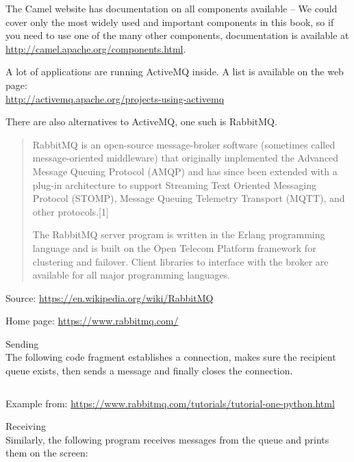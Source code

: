\documentclass[Screen16to9,17pt]{foils}
\begin{document}


The Camel website has documentation on all components available -- We could cover
only the most widely used and important components in this book, so if you need
to use one of the many other components, documentation is available at
\url{http://camel.apache.org/components.html}.


A lot of applications are running ActiveMQ inside. A list is available on the web page:\\
\url{http://activemq.apache.org/projects-using-activemq}

There are also alternatives to ActiveMQ, one such is RabbitMQ.



\begin{quote}
RabbitMQ is an open-source message-broker software (sometimes called message-oriented middleware) that originally implemented the Advanced Message Queuing Protocol (AMQP) and has since been extended with a plug-in architecture to support Streaming Text Oriented Messaging Protocol (STOMP), Message Queuing Telemetry Transport (MQTT), and other protocols.[1]

The RabbitMQ server program is written in the Erlang programming language and is built on the Open Telecom Platform framework for clustering and failover. Client libraries to interface with the broker are available for all major programming languages.
\end{quote}

Source: \url{https://en.wikipedia.org/wiki/RabbitMQ}

Home page: \url{https://www.rabbitmq.com/}



Sending\\
The following code fragment establishes a connection, makes sure the recipient queue exists, then sends a message and finally closes the connection.

\inputminted[fontsize=\footnotesize]{python}{programs/sender.py}

Example from: \url{https://www.rabbitmq.com/tutorials/tutorial-one-python.html}


Receiving\\
Similarly, the following program receives messages from the queue and prints them on the screen:
\end{document}
